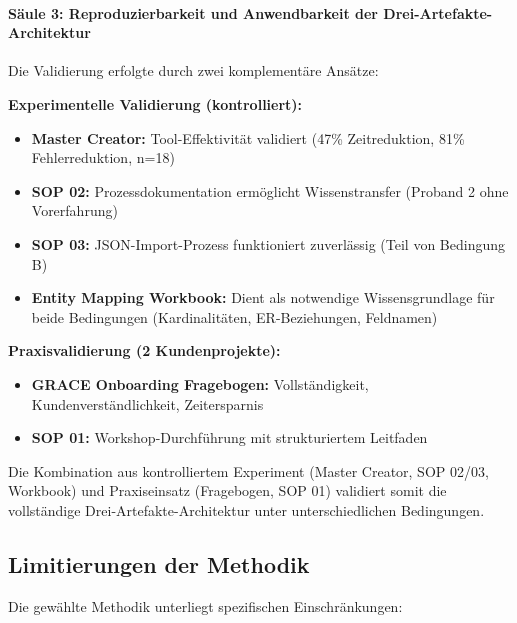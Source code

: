 \paragraph{Säule 3: Reproduzierbarkeit und Anwendbarkeit der Drei-Artefakte-Architektur}

Die Validierung erfolgte durch zwei komplementäre Ansätze:

\textbf{Experimentelle Validierung (kontrolliert):}
\begin{itemize}
    \item \textbf{Master Creator:} Tool-Effektivität validiert (47\% Zeitreduktion, 81\% Fehlerreduktion, n=18)
    \item \textbf{SOP 02:} Prozessdokumentation ermöglicht Wissenstransfer (Proband 2 ohne Vorerfahrung)
    \item \textbf{SOP 03:} JSON-Import-Prozess funktioniert zuverlässig (Teil von Bedingung B)
    \item \textbf{Entity Mapping Workbook:} Dient als notwendige Wissensgrundlage für beide Bedingungen (Kardinalitäten, ER-Beziehungen, Feldnamen)
\end{itemize}

\textbf{Praxisvalidierung (2 Kundenprojekte):}
\begin{itemize}
    \item \textbf{GRACE Onboarding Fragebogen:} Vollständigkeit, Kundenverständlichkeit, Zeitersparnis
    \item \textbf{SOP 01:} Workshop-Durchführung mit strukturiertem Leitfaden
\end{itemize}

Die Kombination aus kontrolliertem Experiment (Master Creator, SOP 02/03, Workbook) und Praxiseinsatz (Fragebogen, SOP 01) validiert somit die vollständige Drei-Artefakte-Architektur unter unterschiedlichen Bedingungen.


\subsection{Limitierungen der Methodik}
\label{subsec:LimitierungenMethodik}

Die gewählte Methodik unterliegt spezifischen Einschränkungen:

